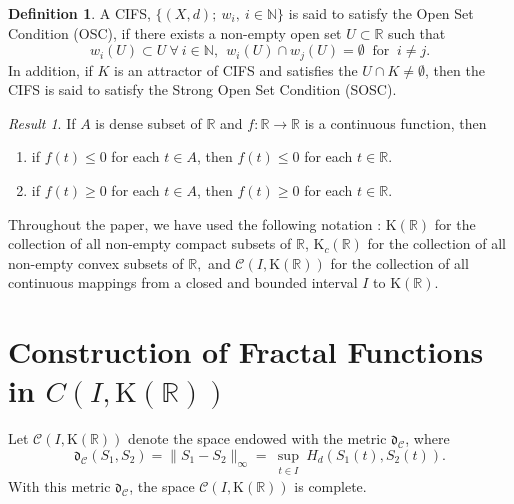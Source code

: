 \documentclass[12pt,oneside,reqno]{amsart}
\theoremstyle{definition}
\newtheorem{definition}[theorem]{Definition}
\theoremstyle{remark}
\newtheorem{result}{Result}
\begin{document}
 
\begin{definition}\cite{Hut}\label{OSC}
A CIFS, $\big\{(X,d);~w_i,~i\in\mathbb{N}\big\}$ is said to satisfy the Open Set Condition (OSC), if there exists a non-empty open set $U\subset \mathbb{R}$ such that 
\[w_i(U)\subset U ~\forall ~ i \in \mathbb{N},~~ w_i(U)\cap w_j(U)=\emptyset ~\text{ for }~ i\neq j.\]
In addition, if $K$ is an attractor of CIFS and satisfies the $U\cap K\neq \emptyset$, then the CIFS is said to satisfy the Strong Open Set Condition (SOSC).
 \end{definition}
 \begin{result} \label{res 4.5}
If $A$ is dense subset of $\mathbb{R}$ and $f: \mathbb{R}\to \mathbb{R}$ is a continuous function, then
\begin{enumerate}
    \item if $f(t)\leq 0$ for each $t\in A$, then $f(t)\leq0$ for each $t\in 
    \mathbb{R}.$
    \item if $f(t)\geq0$ for each $t\in A$, then $f(t)\geq0$ for each $t\in 
    \mathbb{R}.$
\end{enumerate}
\end{result}
Throughout the paper, we have used the following notation : $\mathrm{K}(\mathbb{R})$ for the collection of all non-empty compact subsets of $\mathbb{R}$, $\mathrm{K}_c(\mathbb{R})$ for the collection of all non-empty convex subsets of $\mathbb{R},$ and $\mathcal{C}(I, \mathrm{K}(\mathbb{R}))$ for the collection of all continuous mappings from a closed and bounded interval $I$ to $\mathrm{K}(\mathbb{R}).$
 
  
\section{Construction of Fractal Functions in $C( I, \mathrm{K}( \mathbb{R}) )$}\label{sec3}
Let $\mathcal{C}( I, \mathrm{K}( \mathbb{R}) )$ denote the space endowed with the metric $\mathfrak{d}_{\mathcal{C}}$, where 
\begin{equation*}
    \mathfrak{d}_{\mathcal{C}}(S_1,S_2)=\lVert S_1-S_2 \rVert _{\infty}=\sup_{\substack{t\in I}}H_d( S_1(t),S_2(t)).
          \end{equation*}
With this metric $\mathfrak{d}_{\mathcal{C}}$, the space $  \mathcal{C}( I, \mathrm{K}( \mathbb{R}) ) $ is  complete.
\end{document}
